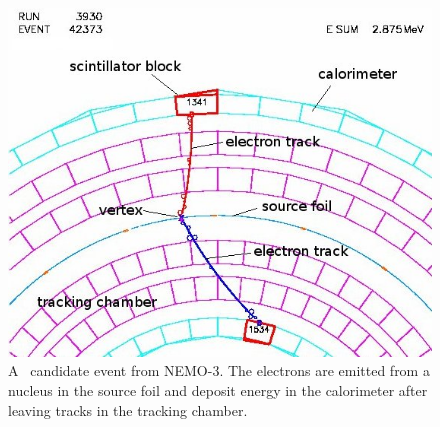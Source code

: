 \begin{figure}[htbp]
\centering
\includegraphics[width=0.7\linewidth]{Figures/nemo3_3930_42373_top_2}
\caption{A \zeronubb~candidate event from NEMO-3. The electrons are emitted from a nucleus in the source foil and deposit energy in the calorimeter after leaving tracks in the tracking chamber.}
\label{fig:nemo3393042373top2}
\end{figure}
